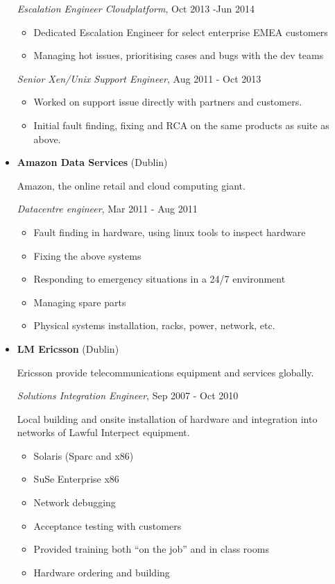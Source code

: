\documentclass[]{article}
\providecommand{\tightlist}{%
  \setlength{\itemsep}{0pt}\setlength{\parskip}{0pt}}
\begin{document}
\begin{itemize}
  \emph{Escalation Engineer Cloudplatform}, Oct 2013 -Jun 2014

  \begin{itemize}
  \tightlist
  \item
    Dedicated Escalation Engineer for select enterprise EMEA customers
  \item
    Managing hot issues, prioritising cases and bugs with the dev teams
  \end{itemize}

  \emph{Senior Xen/Unix Support Engineer}, Aug 2011 - Oct 2013

  \begin{itemize}
  \tightlist
  \item
    Worked on support issue directly with partners and customers.
  \item
    Initial fault finding, fixing and RCA on the same products as suite
    as above.
  \end{itemize}
\item
  \textbf{Amazon Data Services} (Dublin)

  Amazon, the online retail and cloud computing giant.

  \emph{Datacentre engineer}, Mar 2011 - Aug 2011

  \begin{itemize}
  \tightlist
  \item
    Fault finding in hardware, using linux tools to inspect hardware
  \item
    Fixing the above systems
  \item
    Responding to emergency situations in a 24/7 environment
  \item
    Managing spare parts
  \item
    Physical systems installation, racks, power, network, etc.
  \end{itemize}
\item
  \textbf{LM Ericsson} (Dublin)

  Ericsson provide telecommunications equipment and services globally.

  \emph{Solutions Integration Engineer}, Sep 2007 - Oct 2010

  Local building and onsite installation of hardware and integration
  into networks of Lawful Interpect equipment.

  \begin{itemize}
  \tightlist
  \item
    Solaris (Sparc and x86)
  \item
    SuSe Enterprise x86
  \item
    Network debugging
  \item
    Acceptance testing with customers
  \item
    Provided training both ``on the job'' and in class rooms
  \item
    Hardware ordering and building
  \end{itemize}
\end{itemize}
\end{document}
